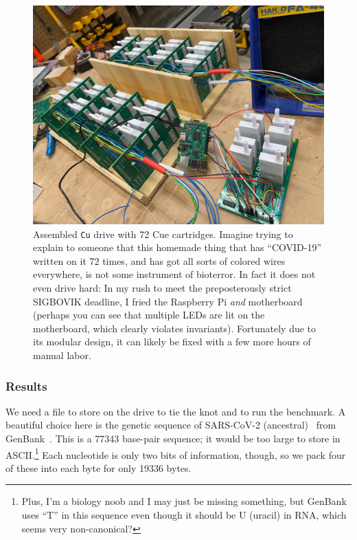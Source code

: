 \documentclass[twocolumn]{article}
\begin{document}
\begin{figure}
  \includegraphics[width=\columnwidth]{cu}
  \caption{
    Assembled {\tt Cu} drive with 72 Cue cartridges. Imagine
    trying to explain to someone that this homemade thing
    that has ``COVID-19'' written on it 72 times, and
    has got all sorts of colored wires everywhere, is not
    some instrument of bioterror. In fact it does not even
    drive hard: In my rush to meet the preposterously strict
    SIGBOVIK deadline, I fried the Raspberry Pi {\em and}
    motherboard (perhaps you can see that multiple LEDs are
    lit on the motherboard, which clearly violates invariants).
    Fortunately due to its modular design, it can likely be fixed
    with a few more hours of manual labor.
  } \label{fig:cu}
\end{figure}

\subsubsection{Results}

We need a file to store on the drive to tie the knot and to run the
benchmark. A beautiful choice here is the genetic sequence of
SARS-CoV-2 (ancestral)~\cite{sarsncov2sequence} from
GenBank~\cite{clark2016genbank}. This is a 77343 base-pair sequence;
it would be too large to store in ASCII.\footnote{Plus, I'm a biology noob
  and I may just be missing something, but GenBank uses ``T'' in
  this sequence even though it should be U (uracil) in RNA, which seems
  very non-canonical?} Each nucleotide is only two bits of information,
though, so we pack four of these into each byte for only 19336 bytes.
\end{document}
